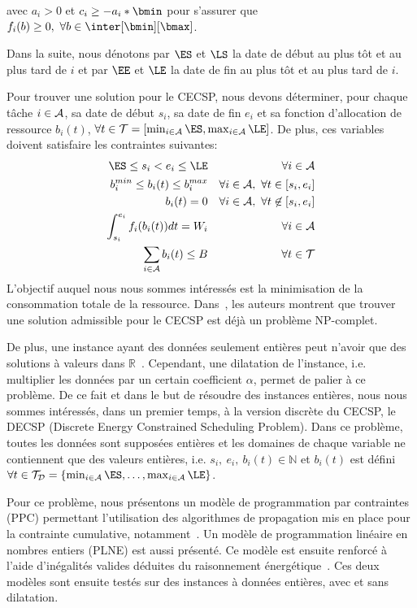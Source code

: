   \noindent
  avec $a_i>0$ et $c_i \geq -a_i*\bmin $ pour
  s'assurer que $f_i(b) \geq 0,\ \forall b \in \inter[\bmin][\bmax]$.

Dans la suite, nous dénotons par $\ES$ et $\LS$
la date de début au plus tôt et au plus tard de $i$ et par
$\EE$ et $\LE$ la date de fin au plus tôt et au
plus tard de $i$.

Pour trouver une solution pour le CECSP, nous devons déterminer, pour
chaque tâche $i \in {\cal A}$, sa date de début $s_i$, sa date de fin
$e_i$ et sa fonction d'allocation de ressource $b_i(t)$, $\forall t
\in {\cal T}=[\min_{i\in{\cal A}} \ES, \max_{i\in {\cal
    A}} \LE]$. De plus, ces variables doivent satisfaire
les contraintes suivantes:
{\scriptsize
\begin{eqnarray} 
  \ES\le s_i < e_i \le \LE & & \forall i \in
{\cal A} \label {tw_CECSP}\\
  b_i^{min} \le b_i(t) \le b_i^{max} & & \forall i \in {\cal A},\
\forall t \in [s_i,e_i] \label {bminmax_CECSP}\\
  b_i(t)=0 & & \forall i \in {\cal A},\ \forall t \not\in
[s_i,e_i] \label {b0_CECSP}\\
  \int_{s_i}^{e_i} f_i(b_i(t))dt =W_i & & \forall i \in {\cal
A} \label{nrj_CECSP}\\
  \sum_{i \in {\cal A}} b_i(t) \le B & & \forall t \in {\cal
T} \label{res_CECSP}
\end{eqnarray}}
L'objectif auquel nous nous sommes intéressés est la minimisation de
la consommation totale de la ressource. Dans~\cite{Nattaf2015}, les
auteurs montrent que trouver une solution admissible pour le CECSP est
déjà un problème NP-complet. 

De plus, une instance ayant des données seulement entières peut
n'avoir que des solutions à valeurs dans
$\mathbb{R}$~\cite{Nattaf2015}. Cependant, une dilatation de
l'instance, i.e. multiplier les données par un certain coefficient
$\alpha$, permet de palier à ce problème. 
De ce fait et dans le but de résoudre des instances entières, nous
nous sommes intéressés, dans un premier temps, à la version discrète
du CECSP, le DECSP (Discrete Energy Constrained Scheduling
Problem). Dans ce problème, toutes les données sont supposées entières
et les domaines de chaque variable ne contiennent
que des valeurs entières, i.e. $s_i,\ e_i,\ b_i(t) \in \mathbb{N}$ et
$b_i(t)$ est défini $\forall t \in {\cal T}_{\cal D}=\{\min_{i\in{\cal
A}} \ES,\dots, \max_{i\in {\cal A}} \LE\}$. 

Pour ce problème, nous présentons un modèle de
programmation par contraintes (PPC) permettant l'utilisation des
algorithmes de propagation mis en place pour la contrainte
cumulative, notamment~\cite{Gay2015}.  Un modèle de
programmation linéaire en nombres entiers (PLNE) est aussi
présenté. Ce modèle est ensuite renforcé à l'aide d'inégalités
valides déduites du raisonnement énergétique~\cite{Lopez1990}. 
Ces deux modèles sont ensuite testés sur des instances à données
entières, avec et sans dilatation.


